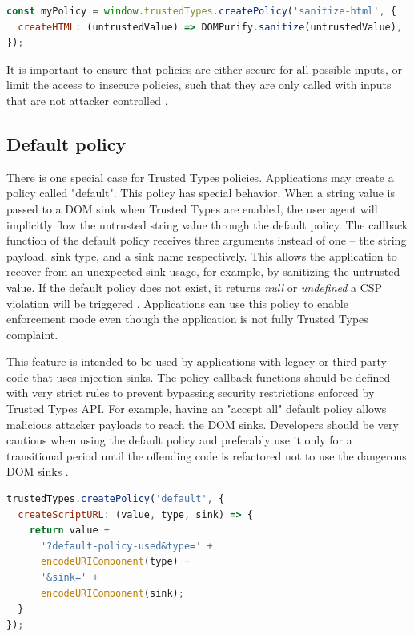 \bigskip
\begin{lstlisting}[language=JavaScript, caption=Using a policy to sanitize HTML values]
const myPolicy = window.trustedTypes.createPolicy('sanitize-html', {
  createHTML: (untrustedValue) => DOMPurify.sanitize(untrustedValue),
});
\end{lstlisting}

It is important to ensure that policies are either secure for all possible inputs, or limit the
access to insecure policies, such that they are only called with inputs that are not attacker
controlled \cite{tt_spec:best_practice_policy}.

\subsection{Default policy}

There is one special case for Trusted Types policies. Applications may create a policy called
"default". This policy has special behavior. When a string value is passed to a DOM sink when
Trusted Types are enabled, the user agent will implicitly flow the untrusted string value through
the default policy. The callback function of the default policy receives three arguments instead of
one -- the string payload, sink type, and a sink name respectively. This allows the application to
recover from an unexpected sink usage, for example, by sanitizing the untrusted value. If the
default policy does not exist, it returns \emph{null} or \emph{undefined} a CSP violation will be
triggered \cite{tt_spec:default_policy}. Applications can use this policy to enable enforcement mode
even though the application is not fully Trusted Types complaint.

This feature is intended to be used by applications with legacy or third-party code that uses
injection sinks. The policy callback functions should be defined with very strict rules to prevent
bypassing security restrictions enforced by Trusted Types API. For example, having an "accept all"
default policy allows malicious attacker payloads to reach the DOM sinks. Developers should be very
cautious when using the default policy and preferably use it only for a transitional period until
the offending code is refactored not to use the dangerous DOM sinks \cite{tt_spec:default_policy}.

\bigskip
\begin{lstlisting}[language=JavaScript, caption=Creating a default policy \cite{tt_spec:default_policy}]
trustedTypes.createPolicy('default', {
  createScriptURL: (value, type, sink) => {
    return value +
      '?default-policy-used&type=' +
      encodeURIComponent(type) +
      '&sink=' +
      encodeURIComponent(sink);
  }
});
\end{lstlisting}

